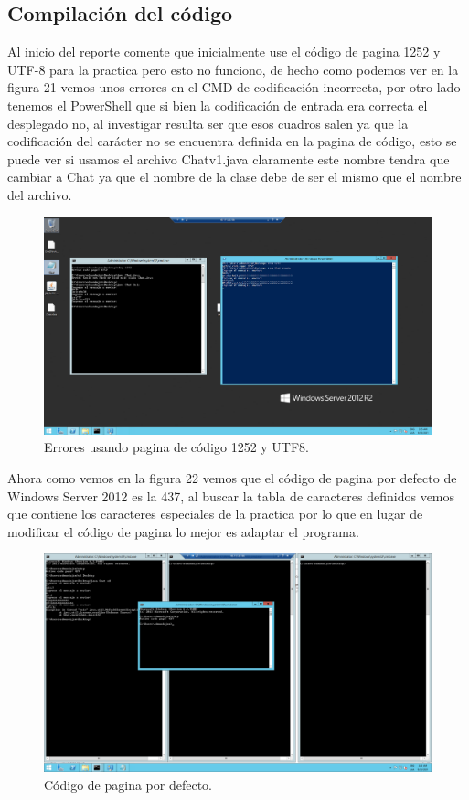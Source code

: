 \documentclass[11pt]{article}
\begin{document}
		\subsection{Compilación del código}
		Al inicio del reporte comente que inicialmente use el código de pagina 1252 y UTF-8 para la practica pero esto no funciono, de hecho como podemos ver en la figura 21 vemos unos errores en el CMD de codificación incorrecta, por otro lado tenemos el PowerShell que si bien la codificación de entrada era correcta el desplegado no, al investigar resulta ser que esos cuadros salen ya que la codificación del carácter no se encuentra definida en la pagina de código, esto se puede ver si usamos el archivo Chatv1.java claramente este nombre tendra que cambiar a Chat ya que el nombre de la clase debe de ser el mismo que el nombre del archivo.
		\begin{figure}[H]
			\centering
			\includegraphics[scale=0.34]{resources/erroreschcp1252.png}
			\caption{Errores usando pagina de código 1252 y UTF8. }\label{fig:picture}
		\end{figure}
		Ahora como vemos en la figura 22 vemos que el código de pagina por defecto de Windows Server 2012 es la 437, al buscar la tabla de caracteres definidos vemos que contiene los caracteres especiales de la practica por lo que en lugar de modificar el código de pagina lo mejor es adaptar el programa.
		\begin{figure}[H]
			\centering
			\includegraphics[scale=0.34]{resources/defaultcp.png}
			\caption{Código de pagina por defecto. }\label{fig:picture}
		\end{figure}
\end{document}
